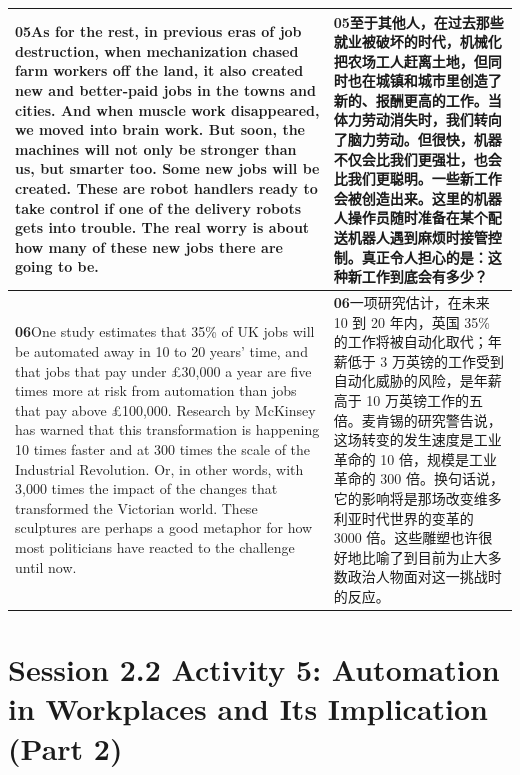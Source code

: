 \documentclass[UTF8,zihao=-4,fontset=fandol]{ctexart}
\newcommand{\TranscriptColumn}{\raggedright\arraybackslash\hyphenpenalty=10000\exhyphenpenalty=10000\sloppy}
\begin{document}
\begin{longtable}{>{\TranscriptColumn}p{} >{\TranscriptColumn}p{}}
\textbf{05}\quad As for the rest, in previous eras of job destruction, when mechanization chased farm workers off the land, it also created new and better-paid jobs in the towns and cities. And when muscle work disappeared, we moved into brain work. But soon, the machines will not only be stronger than us, but smarter too. Some new jobs will be created. These are robot handlers ready to take control if one of the delivery robots gets into trouble. The real worry is about how many of these new jobs there are going to be. & \textbf{05}\quad 至于其他人，在过去那些就业被破坏的时代，机械化把农场工人赶离土地，但同时也在城镇和城市里创造了新的、报酬更高的工作。当体力劳动消失时，我们转向了脑力劳动。但很快，机器不仅会比我们更强壮，也会比我们更聪明。一些新工作会被创造出来。这里的机器人操作员随时准备在某个配送机器人遇到麻烦时接管控制。真正令人担心的是：这种新工作到底会有多少？ \\ \hline
\textbf{06}\quad One study estimates that 35\% of UK jobs will be automated away in 10 to 20 years' time, and that jobs that pay under £30,000 a year are five times more at risk from automation than jobs that pay above £100,000. Research by McKinsey has warned that this transformation is happening 10 times faster and at 300 times the scale of the Industrial Revolution. Or, in other words, with 3,000 times the impact of the changes that transformed the Victorian world. These sculptures are perhaps a good metaphor for how most politicians have reacted to the challenge until now. & \textbf{06}\quad 一项研究估计，在未来 10 到 20 年内，英国 35\% 的工作将被自动化取代；年薪低于 3 万英镑的工作受到自动化威胁的风险，是年薪高于 10 万英镑工作的五倍。麦肯锡的研究警告说，这场转变的发生速度是工业革命的 10 倍，规模是工业革命的 300 倍。换句话说，它的影响将是那场改变维多利亚时代世界的变革的 3000 倍。这些雕塑也许很好地比喻了到目前为止大多数政治人物面对这一挑战时的反应。 \\ \hline
\end{longtable}


\clearpage
\section{Session 2.2 Activity 5: Automation in Workplaces and Its Implication (Part 2)}
\end{document}
